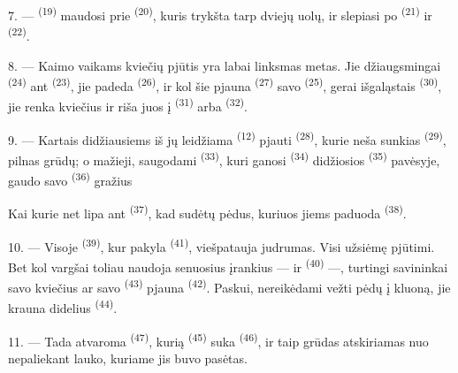 7. ---  \textsuperscript{(19)} maudosi prie 
\textsuperscript{(20)}, kuris trykšta tarp dviejų uolų, ir slepiasi po
 \textsuperscript{(21)} ir 
\textsuperscript{(22)}.

\VUsaut{5.0mm}
\VUsaut{3.4mm}

8. --- Kaimo vaikams kviečių pjūtis yra labai linksmas metas. Jie džiaugsmingai
 \textsuperscript{(24)} ant 
\textsuperscript{(23)}, jie padeda  \textsuperscript{(26)}, ir kol
šie pjauna  \textsuperscript{(27)} savo 
\textsuperscript{(25)}, gerai išgaląstais  \textsuperscript{(30)},
jie renka kviečius ir riša juos į  \textsuperscript{(31)} arba
 \textsuperscript{(32)}.

9. --- Kartais didžiausiems iš jų leidžiama  \textsuperscript{(12)}
pjauti  \textsuperscript{(28)}, kurie neša sunkias
 \textsuperscript{(29)}, pilnas grūdų; o mažieji, saugodami
 \textsuperscript{(33)}, kuri ganosi 
\textsuperscript{(34)} didžiosios  \textsuperscript{(35)} pavėsyje,
gaudo savo  \textsuperscript{(36)} gražius 

Kai kurie net lipa ant  \textsuperscript{(37)}, kad sudėtų pėdus,
kuriuos jiems paduoda  \textsuperscript{(38)}.

10. --- Visoje  \textsuperscript{(39)}, kur pakyla 
\textsuperscript{(41)}, viešpatauja judrumas. Visi užsiėmę pjūtimi. Bet kol vargšai
toliau naudoja senuosius įrankius ---  ir
 \textsuperscript{(40)} ---, turtingi savininkai savo kviečius ar
savo  \textsuperscript{(43)} pjauna 
\textsuperscript{(42)}. Paskui, nereikėdami vežti pėdų į kluoną, jie krauna didelius
 \textsuperscript{(44)}.

11. --- Tada atvaroma  \textsuperscript{(47)}, kurią
 \textsuperscript{(45)} suka 
\textsuperscript{(46)}, ir taip grūdas atskiriamas nuo  nepaliekant
lauko, kuriame jis buvo pasėtas.

